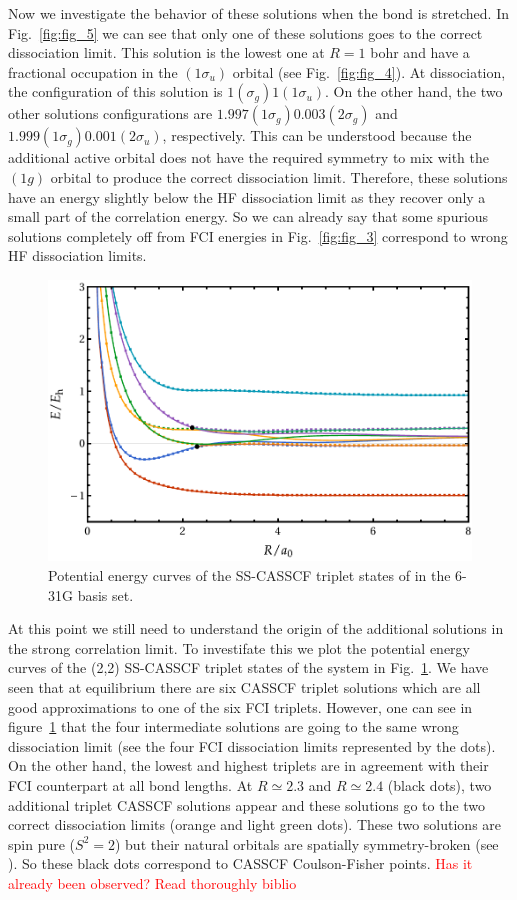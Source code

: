 \documentclass[aps,prb,reprint,showkeys,superscriptaddress]{revtex4-1}
\newcommand{\todo}[1]{\textcolor{red}{#1}}
\begin{document}
Now we investigate the behavior of these solutions when the bond is stretched.
In Fig.~\ref{fig:fig_5} we can see that only one of these solutions goes to the correct dissociation limit.
This solution is the lowest one at $R=1$ bohr and have a fractional occupation in the $(1\sigma_u)$ orbital (see Fig.~\ref{fig:fig_4}).
At dissociation, the configuration of this solution is $1(\sigma_g)1(1\sigma_u)$.
On the other hand, the two other solutions configurations are $1.997(1\sigma_g)0.003(2\sigma_g)$ and $1.999(1\sigma_g)0.001(2\sigma_u)$, respectively.
This can be understood because the additional active orbital does not have the required symmetry to mix with the $(1g)$ orbital to produce the correct dissociation limit.
Therefore, these solutions have an energy slightly below the HF dissociation limit as they recover only a small part of the correlation energy.
So we can already say that some spurious solutions completely off from FCI energies in Fig.~\ref{fig:fig_3} correspond to wrong HF dissociation limits.

\begin{figure}
  \centering
  \includegraphics[width=0.9\linewidth]{Figures/fig_6.pdf}
  \caption{Potential energy curves of the SS-CASSCF triplet states of  in the 6-31G basis set. \label{fig:fig_6}}
\end{figure}

At this point we still need to understand the origin of the additional solutions in the strong correlation limit.
To investifate this we plot the potential energy curves of the (2,2) SS-CASSCF triplet states of the system in Fig.~\ref{fig:fig_6}.
We have seen that at equilibrium there are six CASSCF triplet solutions which are all good approximations to one of the six FCI triplets.
However, one can see in figure~\ref{fig:fig_6} that the four intermediate solutions are going to the same wrong dissociation limit (see the four FCI dissociation limits represented by the dots).
On the other hand, the lowest and highest triplets are in agreement with their FCI counterpart at all bond lengths.
At $R\simeq 2.3$ and $R\simeq 2.4$ (black dots), two additional triplet CASSCF solutions appear and these solutions go to the two correct dissociation limits (orange and light green dots).
These two solutions are spin pure ($S^2=2$) but their natural orbitals are spatially symmetry-broken (see \SupInf).
So these black dots correspond to CASSCF Coulson-Fisher points. \todo{Has it already been observed? Read thoroughly biblio}
\end{document}
